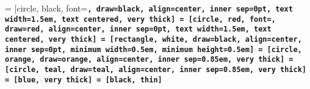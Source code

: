  = [circle, black, font=\bf\tt, draw=black, align=center, inner sep=0pt, text width=1.5em, text centered, very thick]
 = [circle, red,   font=\bf\tt, draw=red,   align=center, inner sep=0pt, text width=1.5em, text centered, very thick]
 = [rectangle, white, draw=black, align=center, inner sep=0pt, minimum width=0.5em, minimum height=0.5em]
 = [circle, orange, draw=orange, align=center, inner sep=0.85em, very thick]
 = [circle, teal,   draw=teal,   align=center, inner sep=0.85em, very thick]
 = [blue, very thick]
 = [black, thin]